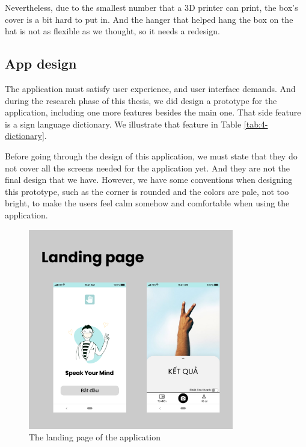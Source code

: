 Nevertheless, due to the smallest number that a 3D printer can print, the box's cover is a bit hard to put in. And the hanger that helped hang the box on the hat is not as flexible as we thought, so it needs a redesign.

\subsection{App design}

The application must satisfy user experience, and user interface demands. And during the research phase of this thesis, we did design a prototype for the application, including one more features besides the main one. That side feature is a sign language dictionary. We illustrate that feature in Table \ref{tab:4-dictionary}.

Before going through the design of this application, we must state that they do not cover all the screens needed for the application yet. And they are not the final design that we have. However, we have some conventions when designing this prototype, such as the corner is rounded and the colors are pale, not too bright, to make the users feel calm somehow and comfortable when using the application.

\begin{figure}[H]
	\centering
	\includegraphics[width=0.8\textwidth]{img/Chap5/Landing_page.png}
	\caption{The landing page of the application}
\end{figure}

